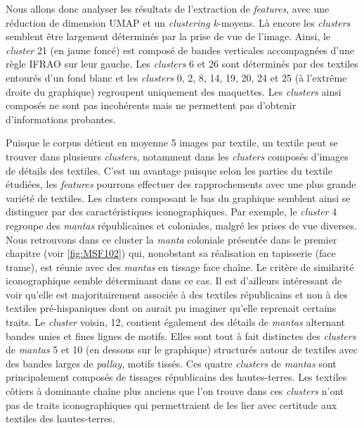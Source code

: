 Nous allons donc analyser les résultats de l'extraction de \textit{features}, avec une réduction de dimension UMAP et un \textit{clustering k}-moyens.
Là encore les  \textit{clusters} semblent être largement déterminés par la prise de vue de l'image. Ainsi, le \textit{cluster} 21 (en jaune foncé) est composé de bandes verticales accompagnées d'une règle IFRAO sur leur gauche. Les \textit{clusters} 6 et 26 sont déterminés par des textiles entourés d'un fond blanc et les \textit{clusters} 0, 2, 8, 14, 19, 20, 24 et 25 (à l'extrême droite du graphique) regroupent uniquement des maquettes. Les \textit{clusters} ainsi composés ne sont pas incohérents mais ne permettent pas d'obtenir d'informations probantes. 

Puisque le corpus détient en moyenne 5 images par textile, un textile peut se trouver dans plusieurs \textit{clusters}, notamment dans les \textit{clusters} composés d'images de détails des textiles. C'est un avantage puisque selon les parties du textile étudiées, les \textit{features} pourrons effectuer des rapprochements avec une plus grande variété de textiles. Les clusters composant le bas du graphique semblent ainsi se distinguer par des caractéristiques iconographiques. Par exemple, le \textit{cluster} 4 regroupe des \textit{mantas} républicaines et coloniales, malgré les prises de vue diverses. Nous retrouvons dans ce cluster la \textit{manta} coloniale présentée dans le premier chapitre (voir \ref{fig:MSF102}) qui, nonobstant sa réalisation en tapisserie (face trame), est réunie avec des \textit{mantas} en tissage face chaîne. Le critère de similarité iconographique semble déterminant dans ce cas. Il est d'ailleurs intéressant de voir qu'elle est majoritairement associée à des textiles républicains et non à des textiles pré-hispaniques dont on aurait pu imaginer qu'elle reprenait certains traits. Le \textit{cluster} voisin, 12, contient également des détails de \textit{mantas} alternant bandes unies et fines lignes de motifs. Elles sont tout à fait distinctes des \textit{clusters} de \textit{mantas} 5 et 10 (en dessous sur le graphique) structurés autour de textiles avec des bandes larges de \textit{pallay}, motifs tissés. Ces quatre \textit{clusters} de \textit{mantas} sont principalement composés de tissages républicains des hautes-terres. Les textiles côtiers à dominante chaîne plus anciens que l'on trouve dans ces \textit{clusters} n'ont pas de traits iconographiques qui permettraient de les lier avec certitude aux textiles des hautes-terres.


%

